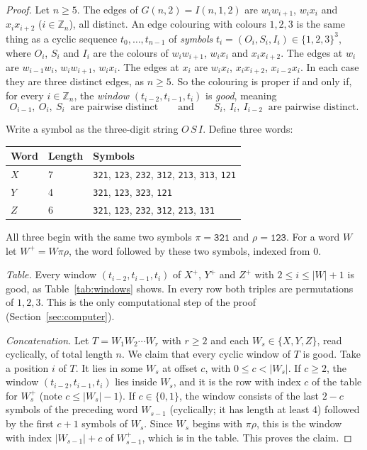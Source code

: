 \documentclass[11pt]{amsart}
\theoremstyle{plain}
\theoremstyle{definition}
\theoremstyle{remark}
\numberwithin{equation}{section}
\newcommand{\Z}{\mathbb{Z}}
\newcommand{\abs}[1]{\lvert #1\rvert}
\newcommand{\sym}[1]{\texttt{#1}}
\begin{document}
\begin{proof}
Let \(n\ge5\). The edges of \(G(n,2)=I(n,1,2)\) are \(w_iw_{i+1}\), \(w_ix_i\) and \(x_ix_{i+2}\) (\(i\in\Z_n\)), all distinct. An edge colouring with colours \(1,2,3\) is the same thing as a cyclic sequence \(t_0,\dots,t_{n-1}\) of \emph{symbols} \(t_i=(O_i,S_i,I_i)\in\{1,2,3\}^3\), where \(O_i\), \(S_i\) and \(I_i\) are the colours of \(w_iw_{i+1}\), \(w_ix_i\) and \(x_ix_{i+2}\). The edges at \(w_i\) are \(w_{i-1}w_i\), \(w_iw_{i+1}\), \(w_ix_i\). The edges at \(x_i\) are \(w_ix_i\), \(x_ix_{i+2}\), \(x_{i-2}x_i\). In each case they are three distinct edges, as \(n\ge5\). So the colouring is proper if and only if, for every \(i\in\Z_n\), the \emph{window} \((t_{i-2},t_{i-1},t_i)\) is \emph{good}, meaning
\begin{equation}\label{eq:good}
O_{i-1},\ O_i,\ S_i\ \text{ are pairwise distinct}\qquad\text{and}\qquad S_i,\ I_i,\ I_{i-2}\ \text{ are pairwise distinct}.
\end{equation}

Write a symbol as the three-digit string \(O\,S\,I\). Define three words:
\begin{center}
\begin{tabular}{lll}
\toprule
Word & Length & Symbols \\
\midrule
\(X\) & 7 & \sym{321}, \sym{123}, \sym{232}, \sym{312}, \sym{213}, \sym{313}, \sym{121} \\
\(Y\) & 4 & \sym{321}, \sym{123}, \sym{323}, \sym{121} \\
\(Z\) & 6 & \sym{321}, \sym{123}, \sym{232}, \sym{312}, \sym{213}, \sym{131} \\
\bottomrule
\end{tabular}
\end{center}
All three begin with the same two symbols \(\pi=\sym{321}\) and \(\rho=\sym{123}\). For a word \(W\) let \(W^+=W\pi\rho\), the word followed by these two symbols, indexed from \(0\).

\emph{Table.} Every window \((t_{i-2},t_{i-1},t_i)\) of \(X^+\), \(Y^+\) and \(Z^+\) with \(2\le i\le \abs{W}+1\) is good, as Table~\ref{tab:windows} shows. In every row both triples are permutations of \(1,2,3\). This is the only computational step of the proof (Section~\ref{sec:computer}).

\emph{Concatenation.} Let \(T=W_1W_2\cdots W_r\) with \(r\ge 2\) and each \(W_s\in\{X,Y,Z\}\), read cyclically, of total length \(n\). We claim that every cyclic window of \(T\) is good. Take a position \(i\) of \(T\). It lies in some \(W_s\) at offset \(c\), with \(0\le c<\abs{W_s}\). If \(c\ge2\), the window \((t_{i-2},t_{i-1},t_i)\) lies inside \(W_s\), and it is the row with index \(c\) of the table for \(W_s^+\) (note \(c\le \abs{W_s}-1\)). If \(c\in\{0,1\}\), the window consists of the last \(2-c\) symbols of the preceding word \(W_{s-1}\) (cyclically; it has length at least \(4\)) followed by the first \(c+1\) symbols of \(W_s\). Since \(W_s\) begins with \(\pi\rho\), this is the window with index \(\abs{W_{s-1}}+c\) of \(W_{s-1}^+\), which is in the table. This proves the claim.


\end{proof}
\end{document}
